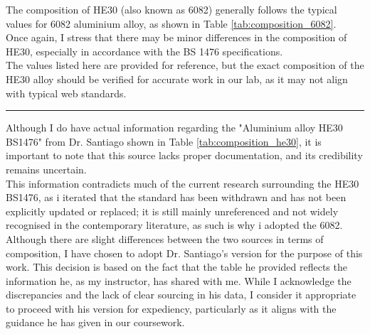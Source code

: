 \documentclass{article}
\begin{document}
\hfill
\begin{minipage}{0.55\textwidth}
    The composition of HE30 (also known as 6082) generally follows the typical values for 6082 aluminium alloy, as shown in Table \ref{tab:composition_6082}.\\[1em]
    Once again, I stress that there may be minor differences in the composition of HE30, especially in accordance with the BS 1476 specifications.\\[1em] 
    The values listed here are provided for reference, but the exact composition of the HE30 alloy should be verified for accurate work in our lab, as it may not align with typical web standards.
    \vspace{1em}\hrule\vspace{1em}
    Although I do have actual information regarding the "Aluminium alloy HE30 BS1476" from Dr. Santiago shown in Table \ref{tab:composition_he30}, it is important to note that this source lacks proper documentation, and its credibility remains uncertain.\\[1em]
    This information contradicts much of the current research surrounding the HE30 BS1476, as i iterated that the standard has been withdrawn and has not been explicitly updated or replaced; it is still mainly unreferenced and not widely recognised in the contemporary literature, as such is why i adopted the 6082.\\[1em]
    Although there are slight differences between the two sources in terms of composition, I have chosen to adopt Dr. Santiago's version for the purpose of this work. This decision is based on the fact that the table he provided reflects the information he, as my instructor, has shared with me. While I acknowledge the discrepancies and the lack of clear sourcing in his data, I consider it appropriate to proceed with his version for expediency, particularly as it aligns with the guidance he has given in our coursework.
\end{minipage}\\

\raggedright
\end{document}
